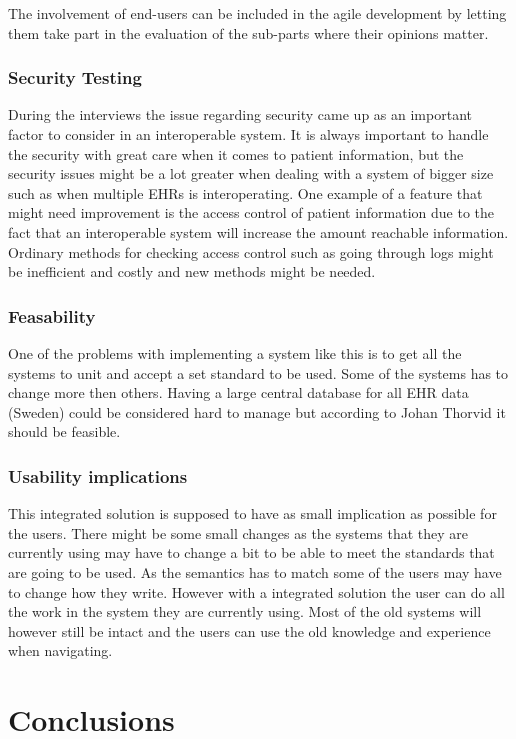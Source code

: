 \documentclass[14pt]{article}
\begin{document}
The involvement of end-users can be included in the agile development by letting them take part in the evaluation of the sub-parts where their opinions matter. 

\subsubsection{Security Testing}
During the interviews the issue regarding security came up as an important factor to consider in an interoperable system. It is always important to handle the security with great care when it comes to patient information, but the security issues might be a lot greater when dealing with a system of bigger size such as when multiple \glspl{EHR} is interoperating. One example of a feature that might need improvement is the access control of patient information due to the fact that an interoperable system will increase the amount reachable information. Ordinary methods for checking access control such as going through logs might be inefficient and costly and new methods might be needed.

\subsubsection{Feasability}
One of the problems with implementing a system like this is to get all the systems to unit and accept a set standard to be used. Some of the systems has to change more then others.
Having a large central database for all \gls{EHR} data (Sweden) could be considered hard to manage but according to Johan Thorvid it should be feasible.

\subsubsection{Usability implications}
This integrated solution is supposed to have as small implication as possible for the users. There might be some small changes as the systems that they are currently using may have to change a bit to be able to meet the standards that are going to be used. As the semantics has to match some of the users may have to change how they write. However with a integrated solution the user can do all the work in the system they are currently using. Most of the old systems will however still be intact and the users can use the old knowledge and experience when navigating.

\newpage

\section{Conclusions}
\label{sec:Conclusions}



\newpage
\printglossaries
\newpage

\begin{appendix}
\end{appendix}



 
 
\end{document}
